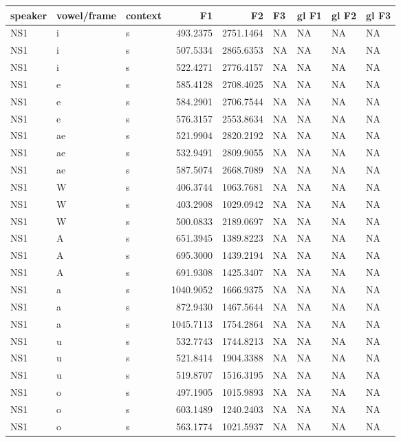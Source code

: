 \documentclass[man, fleqn, noextraspace]{apa6}
\begin{document}
\begin{tabular}{l|l|l|r|r|l|l|l|l}
\hline
speaker & vowel/frame & context & F1 & F2 & F3 & gl F1 & gl F2 & gl F3\\
\hline
NS1 & i & s & 493.2375 & 2751.1464 & NA & NA & NA & NA\\
\hline
NS1 & i & s & 507.5334 & 2865.6353 & NA & NA & NA & NA\\
\hline
NS1 & i & s & 522.4271 & 2776.4157 & NA & NA & NA & NA\\
\hline
NS1 & e & s & 585.4128 & 2708.4025 & NA & NA & NA & NA\\
\hline
NS1 & e & s & 584.2901 & 2706.7544 & NA & NA & NA & NA\\
\hline
NS1 & e & s & 576.3157 & 2553.8634 & NA & NA & NA & NA\\
\hline
NS1 & ae & s & 521.9904 & 2820.2192 & NA & NA & NA & NA\\
\hline
NS1 & ae & s & 532.9491 & 2809.9055 & NA & NA & NA & NA\\
\hline
NS1 & ae & s & 587.5074 & 2668.7089 & NA & NA & NA & NA\\
\hline
NS1 & W & s & 406.3744 & 1063.7681 & NA & NA & NA & NA\\
\hline
NS1 & W & s & 403.2908 & 1029.0942 & NA & NA & NA & NA\\
\hline
NS1 & W & s & 500.0833 & 2189.0697 & NA & NA & NA & NA\\
\hline
NS1 & A & s & 651.3945 & 1389.8223 & NA & NA & NA & NA\\
\hline
NS1 & A & s & 695.3000 & 1439.2194 & NA & NA & NA & NA\\
\hline
NS1 & A & s & 691.9308 & 1425.3407 & NA & NA & NA & NA\\
\hline
NS1 & a & s & 1040.9052 & 1666.9375 & NA & NA & NA & NA\\
\hline
NS1 & a & s & 872.9430 & 1467.5644 & NA & NA & NA & NA\\
\hline
NS1 & a & s & 1045.7113 & 1754.2864 & NA & NA & NA & NA\\
\hline
NS1 & u & s & 532.7743 & 1744.8213 & NA & NA & NA & NA\\
\hline
NS1 & u & s & 521.8414 & 1904.3388 & NA & NA & NA & NA\\
\hline
NS1 & u & s & 519.8707 & 1516.3195 & NA & NA & NA & NA\\
\hline
NS1 & o & s & 497.1905 & 1015.9893 & NA & NA & NA & NA\\
\hline
NS1 & o & s & 603.1489 & 1240.2403 & NA & NA & NA & NA\\
\hline
NS1 & o & s & 563.1774 & 1021.5937 & NA & NA & NA & NA\\

\end{tabular}
\end{document}
